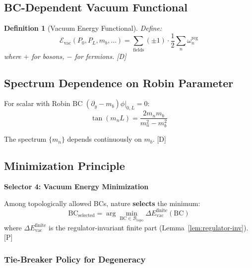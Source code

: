 \documentclass[11pt,a4paper]{article}
\newtheorem{definition}[theorem]{Definition}
\newcommand{\tagD}{\textcolor{blue!70!black}{[D]}}
\newcommand{\tagP}{\textcolor{green!50!black}{[P]}}
\begin{document}
\subsection{BC-Dependent Vacuum Functional}

\begin{definition}[Vacuum Energy Functional]
\label{def:vac-functional}
Define:
\begin{equation}
\label{eq:vac-functional}
\mathcal{E}_{\text{vac}}(P_0, P_L, m_b, \ldots) = \sum_{\text{fields}} (\pm 1) \cdot \frac{1}{2} \sum_n \omega_n^{\text{reg}}
\end{equation}
where $+$ for bosons, $-$ for fermions. \tagD
\end{definition}

\subsection{Spectrum Dependence on Robin Parameter}

For scalar with Robin BC $(\partial_y - m_b)\phi|_{0,L} = 0$:
\begin{equation}
\label{eq:robin-spectrum}
\tan(m_n L) = \frac{2 m_n m_b}{m_n^2 - m_b^2}
\end{equation}

The spectrum $\{m_n\}$ depends continuously on $m_b$. \tagD

\subsection{Minimization Principle}

\begin{selectorbox}
\textbf{Selector 4: Vacuum Energy Minimization}

Among topologically allowed BCs, nature \textbf{selects} the minimum:
\begin{equation}
\label{eq:vac-selector}
\boxed{\text{BC}_{\text{selected}} = \arg\min_{\text{BC} \in \mathcal{B}_{\text{topo}}} \Delta E_{\text{vac}}^{\text{finite}}(\text{BC})}
\end{equation}
where $\Delta E_{\text{vac}}^{\text{finite}}$ is the regulator-invariant finite part
(Lemma~\ref{lem:regulator-inv}). \tagP
\end{selectorbox}

\subsubsection{Tie-Breaker Policy for Degeneracy}
\end{document}

